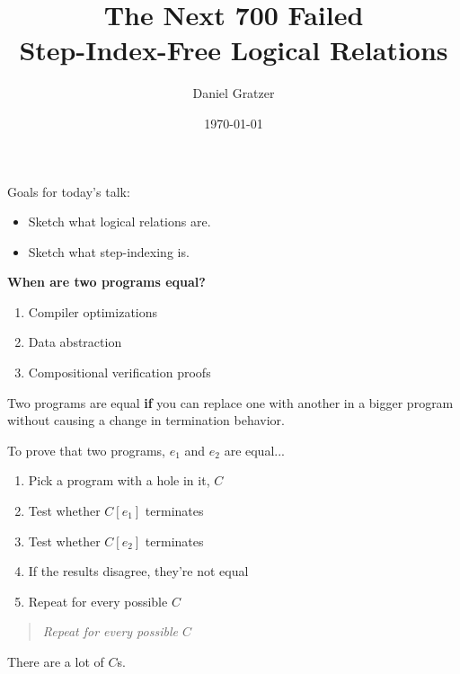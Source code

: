 \documentclass{beamer}
\title{The Next 700 Failed \\Step-Index-Free Logical Relations}
\author{Daniel Gratzer}
\date{\today}
\begin{document}
\begin{frame}
  \titlepage
\end{frame}

\begin{frame}
  \centering
  Goals for today's talk:
  \begin{itemize}
  \item Sketch what logical relations are.
  \item Sketch what step-indexing is.
  \end{itemize}
\end{frame}

\begin{frame}
  \begin{center}
    \bf When are two programs equal?
  \end{center}
  \begin{enumerate}
  \item<2-> Compiler optimizations
  \item<3-> Data abstraction
  \item<4-> Compositional verification proofs
  \end{enumerate}
\end{frame}

\begin{frame}
  \begin{center}
    Two programs are equal \textbf{if} you can replace one with
    another in a bigger program without causing a change in termination
    behavior.
  \end{center}
\end{frame}

\begin{frame}
  \centering
  To prove that two programs, $e_1$ and $e_2$ are equal...
  \begin{enumerate}
  \item Pick a program with a hole in it, $C$
  \item Test whether $C[e_1]$ terminates
  \item Test whether $C[e_2]$ terminates
  \item If the results disagree, they're not equal
  \item Repeat for every possible $C$
  \end{enumerate}
\end{frame}

\begin{frame}
  \centering
  \begin{quote}
    \centering\it Repeat for every possible $C$
  \end{quote}
  There are a lot of $C$s.
\end{frame}
\end{document}
